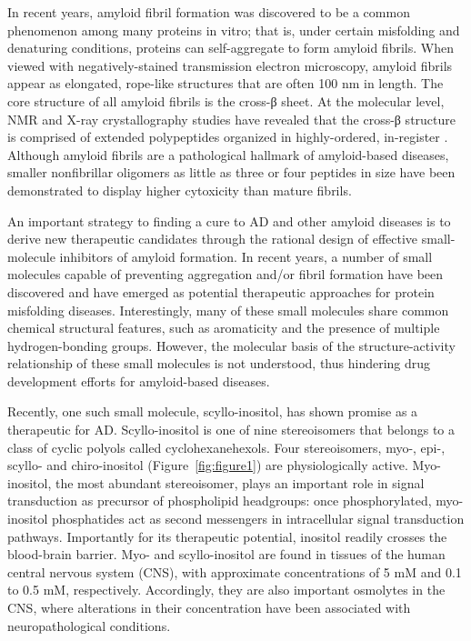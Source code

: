 In recent years, amyloid fibril formation was discovered to be a common phenomenon among many proteins in vitro; that is, under certain misfolding and denaturing conditions, proteins can self-aggregate to form amyloid fibrils.\cite{Chiti:2006p20} When viewed with negatively-stained transmission electron microscopy, amyloid fibrils appear as elongated, rope-like structures that are often 100 nm in length.\cite{Chiti:2006p20} The core structure of all amyloid fibrils is the cross-β sheet.\cite{Chiti:2006p20,Serpell:2000p39} At the molecular level, NMR\cite{Balbach:2000p49,Petkova:2006p48} and X-ray crystallography\cite{Sawaya:2007p11} studies have revealed that the cross-β structure is comprised of extended polypeptides organized in highly-ordered, in-register \bsheets. Although amyloid fibrils are a pathological hallmark of amyloid-based diseases, smaller nonfibrillar oligomers as little as three or four peptides in size have been demonstrated to display higher cytoxicity than mature fibrils.\cite{Gong:2003p22,Bitan:2003p10,Caughey:2009p5,Keshet:2010p61,Kitamura:2010p6,Lambert:1998p60,Selkoe:2008p16}

An important strategy to finding a cure to AD and other amyloid diseases is to derive new therapeutic candidates through the rational design of effective small-molecule inhibitors of amyloid formation. In recent years, a number of small molecules capable of preventing aggregation and/or fibril formation have been discovered and have emerged as potential therapeutic approaches for protein misfolding diseases.\cite{Frid:2007p65,Hawkes:2009p9,LeVine:2009p38,Necula:2007p42,ScherzerAttali:2010p63,Sood:2009p14} Interestingly, many of these small molecules share common chemical structural features, such as aromaticity and the presence of multiple hydrogen-bonding groups.\cite{Ehrnhoefer:2008p8,Liu:2009p18,Liu:2005p7,Porat:2006p33} However, the molecular basis of the structure-activity relationship of these small molecules is not understood, thus hindering drug development efforts for amyloid-based diseases.

Recently, one such small molecule, scyllo-inositol, has shown promise as a therapeutic for AD.\cite{McLaurin:2006p29,McLaurin:2000p64} Scyllo-inositol is one of nine stereoisomers that belongs to a class of cyclic polyols called cyclohexanehexols. Four stereoisomers, myo-, epi-, scyllo- and chiro-inositol (Figure~\ref{fig:figure1}) are physiologically active.\cite{Fisher:2002p62} Myo-inositol, the most abundant stereoisomer, plays an important role in signal transduction as precursor of phospholipid headgroups: once phosphorylated, myo-inositol phosphatides act as second messengers in intracellular signal transduction pathways.\cite{Fisher:2002p62} Importantly for its therapeutic potential, inositol readily crosses the blood-brain barrier. Myo- and scyllo-inositol are found in tissues of the human central nervous system (CNS), with approximate concentrations of 5 mM and 0.1 to 0.5 mM, respectively.\cite{Michaelis:1993p89} Accordingly, they are also important osmolytes in the CNS, where alterations in their concentration have been associated with neuropathological conditions.\cite{Fisher:2002p62,Michell:2008p4}
 
